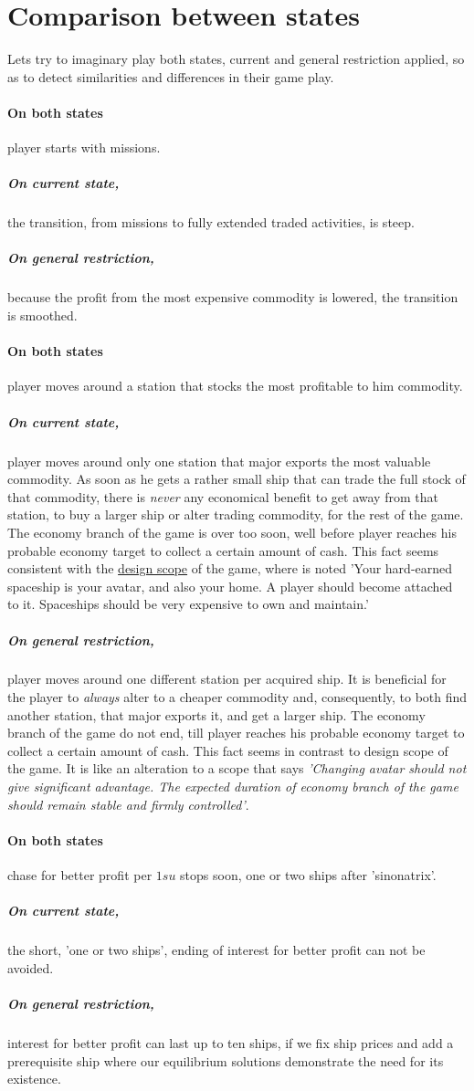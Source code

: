 \documentclass[]{article}
\begin{document}
\section{Comparison between states}
Lets try to imaginary play both states, current and general restriction applied, so as to detect similarities and differences in their game play.
\paragraph*{On both states} player starts with missions.
\subparagraph*{On current state,} the transition, from missions to fully extended traded activities, is steep.
\subparagraph*{On general restriction,} because the profit from the most expensive commodity is lowered, the transition is smoothed.
\paragraph{On both states} player moves around a station that stocks the most profitable to him commodity.
\subparagraph*{On current state,} player moves around only one station that major exports the most valuable commodity. As soon as he gets a rather small ship that can trade the full stock of that commodity, there is \emph{never} any economical benefit to get away from that station, to buy a larger ship or alter trading commodity, for the rest of the game. The economy branch of the game is over too soon, well before player reaches his probable economy target to collect a certain amount of cash. This fact seems consistent with the \hyperref{https://pioneerwiki.com/wiki/Design_Scope}{}{}{design scope} of the game, where is noted \textsf{'Your hard-earned spaceship is your avatar, and also your home. A player should become attached to it. Spaceships should be very expensive to own and maintain.'}
\subparagraph*{On general restriction,} player moves around one different station per acquired ship. It is beneficial for the player to \emph{always} alter to a cheaper commodity and, consequently, to both find another station, that major exports it, and get a larger ship. The economy branch of the game do not end, till player reaches his probable economy target to collect a certain amount of cash. This fact seems in contrast to design scope of the game. It is like an alteration to a scope that says \emph{'Changing avatar should not give significant advantage. The expected duration of economy branch of the game should remain stable and firmly controlled'}.   
\paragraph{On both states} chase for better profit per $1su$ stops soon, one or two ships after 'sinonatrix'.
\subparagraph*{On current state,} the short, 'one or two ships', ending of interest for better profit can not be avoided.
\subparagraph*{On general restriction,} interest for better profit can last up to ten ships, if we fix ship prices and add a prerequisite ship where our equilibrium solutions demonstrate the need for its existence. 
\end{document}

